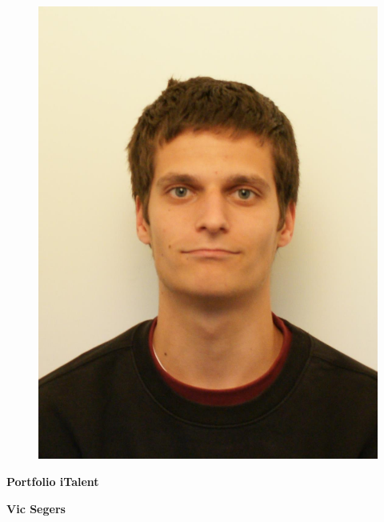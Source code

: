 \begin{titlepage}
  \hspace{0pt}
  \vfill
  \begin{figure}[h!]
    \centering
    \includegraphics[width=0.40\linewidth]{images/Vic_Segers.jpg}
  \end{figure}
  \begin{center}
    \Huge\textbf{{Portfolio iTalent}}
  \end{center}
  \begin{center}
    \Large\textbf{Vic Segers}
  \end{center}
  \vfill
  \hspace{0pt}
\end{titlepage}